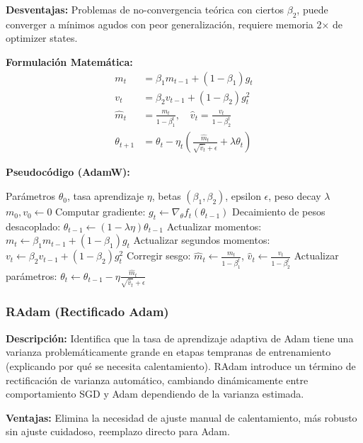 \documentclass[11pt,a4paper]{article}
\begin{document}
\textbf{Desventajas:} Problemas de no-convergencia teórica con ciertos $\beta_2$, puede converger a mínimos agudos con peor generalización, requiere memoria 2× de optimizer states.

\textbf{Formulación Matemática:}
\begin{align}
m_t &= \beta_1 m_{t-1} + (1 - \beta_1) g_t \\
v_t &= \beta_2 v_{t-1} + (1 - \beta_2) g_t^2 \\
\hat{m}_t &= \frac{m_t}{1 - \beta_1^t}, \quad \hat{v}_t = \frac{v_t}{1 - \beta_2^t} \\
\theta_{t+1} &= \theta_t - \eta_t \left( \frac{\hat{m}_t}{\sqrt{\hat{v}_t} + \epsilon} + \lambda \theta_t \right)
\end{align}

\textbf{Pseudocódigo (AdamW):}
\begin{algorithm}
\caption{AdamW --- Adam Desacoplado}
\begin{algorithmic}[1]
\Require Parámetros $\theta_0$, tasa aprendizaje $\eta$, betas $(\beta_1, \beta_2)$, epsilon $\epsilon$, peso decay $\lambda$
\State $m_0, v_0 \gets 0$
\State Computar gradiente: $g_t \gets \nabla_\theta f_t(\theta_{t-1})$
\State Decaimiento de pesos desacoplado: $\theta_{t-1} \gets (1 - \lambda \eta) \theta_{t-1}$
\State Actualizar momentos: $m_t \gets \beta_1 m_{t-1} + (1 - \beta_1) g_t$
\State Actualizar segundos momentos: $v_t \gets \beta_2 v_{t-1} + (1 - \beta_2) g_t^2$
\State Corregir sesgo: $\hat{m}_t \gets \frac{m_t}{1 - \beta_1^t}$, $\hat{v}_t \gets \frac{v_t}{1 - \beta_2^t}$
\State Actualizar parámetros: $\theta_t \gets \theta_{t-1} - \eta \frac{\hat{m}_t}{\sqrt{\hat{v}_t} + \epsilon}$
\EndFor
\end{algorithmic}
\end{algorithm}

\subsubsection{RAdam (Rectificado Adam)}

\textbf{Descripción:} Identifica que la tasa de aprendizaje adaptiva de Adam tiene una varianza problemáticamente grande en etapas tempranas de entrenamiento (explicando por qué se necesita calentamiento). RAdam introduce un término de rectificación de varianza automático, cambiando dinámicamente entre comportamiento SGD y Adam dependiendo de la varianza estimada.

\textbf{Ventajas:} Elimina la necesidad de ajuste manual de calentamiento, más robusto sin ajuste cuidadoso, reemplazo directo para Adam.
\end{document}
